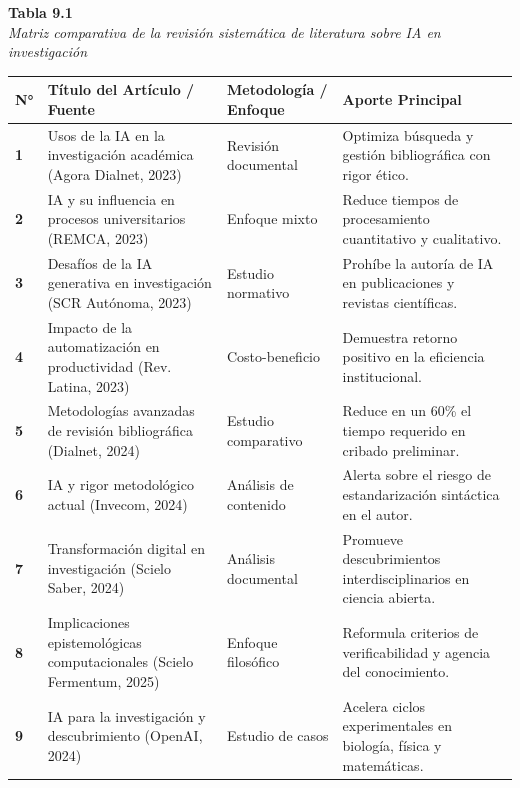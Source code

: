 \begin{table}[htpb!]
    \centering
    \small\sffamily
    \raggedright
    \textbf{Tabla 9.1}\\
    \textit{Matriz comparativa de la revisión sistemática de literatura sobre IA en investigación}\\[0.2cm]
    \centering
    \scriptsize
    \renewcommand{\arraystretch}{1.25}
    \begin{tabularx}{\textwidth}{>{\centering\arraybackslash\bfseries}p{0.6cm} >{\raggedright\arraybackslash}p{4.2cm} >{\raggedright\arraybackslash}p{2.6cm} >{\raggedright\arraybackslash}X}
    \toprule
    \textbf{N°} & \textbf{Título del Artículo / Fuente} & \textbf{Metodología / Enfoque} & \textbf{Aporte Principal} \\
    \midrule
    1 & Usos de la IA en la investigación académica (Agora Dialnet, 2023) & Revisión documental & Optimiza búsqueda y gestión bibliográfica con rigor ético. \\
    2 & IA y su influencia en procesos universitarios (REMCA, 2023) & Enfoque mixto & Reduce tiempos de procesamiento cuantitativo y cualitativo. \\
    3 & Desafíos de la IA generativa en investigación (SCR Autónoma, 2023) & Estudio normativo & Prohíbe la autoría de IA en publicaciones y revistas científicas. \\
    4 & Impacto de la automatización en productividad (Rev. Latina, 2023) & Costo-beneficio & Demuestra retorno positivo en la eficiencia institucional. \\
    5 & Metodologías avanzadas de revisión bibliográfica (Dialnet, 2024) & Estudio comparativo & Reduce en un 60\% el tiempo requerido en cribado preliminar. \\
    6 & IA y rigor metodológico actual (Invecom, 2024) & Análisis de contenido & Alerta sobre el riesgo de estandarización sintáctica en el autor. \\
    7 & Transformación digital en investigación (Scielo Saber, 2024) & Análisis documental & Promueve descubrimientos interdisciplinarios en ciencia abierta. \\
    8 & Implicaciones epistemológicas computacionales (Scielo Fermentum, 2025) & Enfoque filosófico & Reformula criterios de verificabilidad y agencia del conocimiento. \\
    9 & IA para la investigación y descubrimiento (OpenAI, 2024) & Estudio de casos & Acelera ciclos experimentales en biología, física y matemáticas. \\

\end{tabularx}
\end{table}
